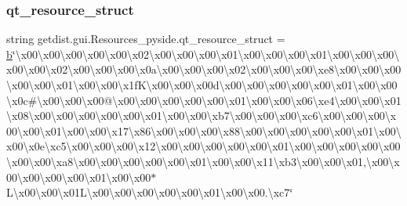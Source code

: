 \subsubsection{\texorpdfstring{qt\+\_\+resource\+\_\+struct}{qt\_resource\_struct}}
{\footnotesize\ttfamily string getdist.\+gui.\+Resources\+\_\+pyside.\+qt\+\_\+resource\+\_\+struct = \mbox{\hyperlink{plotTT_8m_ac0431efac4d7c393d1e70b86115cb93f}{b}}\char`\"{}\textbackslash{}x00\textbackslash{}x00\textbackslash{}x00\textbackslash{}x00\textbackslash{}x00\textbackslash{}x02\textbackslash{}x00\textbackslash{}x00\textbackslash{}x00\textbackslash{}x01\textbackslash{}x00\textbackslash{}x00\textbackslash{}x00\textbackslash{}x01\textbackslash{}x00\textbackslash{}x00\textbackslash{}x00\textbackslash{}x00\textbackslash{}x00\textbackslash{}x02\textbackslash{}x00\textbackslash{}x00\textbackslash{}x00\textbackslash{}x0a\textbackslash{}x00\textbackslash{}x00\textbackslash{}x00\textbackslash{}x02\textbackslash{}x00\textbackslash{}x00\textbackslash{}x00\textbackslash{}xe8\textbackslash{}x00\textbackslash{}x00\textbackslash{}x00\textbackslash{}x00\textbackslash{}x00\textbackslash{}x01\textbackslash{}x00\textbackslash{}x00\textbackslash{}x1f\+K\textbackslash{}x00\textbackslash{}x00\textbackslash{}x00d\textbackslash{}x00\textbackslash{}x00\textbackslash{}x00\textbackslash{}x00\textbackslash{}x00\textbackslash{}x01\textbackslash{}x00\textbackslash{}x00\textbackslash{}x0c\#\textbackslash{}x00\textbackslash{}x00\textbackslash{}x00@\textbackslash{}x00\textbackslash{}x00\textbackslash{}x00\textbackslash{}x00\textbackslash{}x00\textbackslash{}x01\textbackslash{}x00\textbackslash{}x00\textbackslash{}x06\textbackslash{}xe4\textbackslash{}x00\textbackslash{}x00\textbackslash{}x01\textbackslash{}x08\textbackslash{}x00\textbackslash{}x00\textbackslash{}x00\textbackslash{}x00\textbackslash{}x00\textbackslash{}x01\textbackslash{}x00\textbackslash{}x00\textquotesingle{}\textbackslash{}xb7\textbackslash{}x00\textbackslash{}x00\textbackslash{}x00\textbackslash{}xc6\textbackslash{}x00\textbackslash{}x00\textbackslash{}x00\textbackslash{}x00\textbackslash{}x00\textbackslash{}x01\textbackslash{}x00\textbackslash{}x00\textbackslash{}x17\textbackslash{}x86\textbackslash{}x00\textbackslash{}x00\textbackslash{}x00\textbackslash{}x88\textbackslash{}x00\textbackslash{}x00\textbackslash{}x00\textbackslash{}x00\textbackslash{}x00\textbackslash{}x01\textbackslash{}x00\textbackslash{}x00\textbackslash{}x0e\textbackslash{}xc5\textbackslash{}x00\textbackslash{}x00\textbackslash{}x00\textbackslash{}x12\textbackslash{}x00\textbackslash{}x00\textbackslash{}x00\textbackslash{}x00\textbackslash{}x00\textbackslash{}x01\textbackslash{}x00\textbackslash{}x00\textbackslash{}x00\textbackslash{}x00\textbackslash{}x00\textbackslash{}x00\textbackslash{}x00\textbackslash{}xa8\textbackslash{}x00\textbackslash{}x00\textbackslash{}x00\textbackslash{}x00\textbackslash{}x00\textbackslash{}x01\textbackslash{}x00\textbackslash{}x00\textbackslash{}x11\textbackslash{}xb3\textbackslash{}x00\textbackslash{}x00\textbackslash{}x01,\textbackslash{}x00\textbackslash{}x00\textbackslash{}x00\textbackslash{}x00\textbackslash{}x00\textbackslash{}x01\textbackslash{}x00\textbackslash{}x00$\ast$L\textbackslash{}x00\textbackslash{}x00\textbackslash{}x01\+L\textbackslash{}x00\textbackslash{}x00\textbackslash{}x00\textbackslash{}x00\textbackslash{}x00\textbackslash{}x01\textbackslash{}x00\textbackslash{}x00.\textbackslash{}xc7\char`\"{}}

